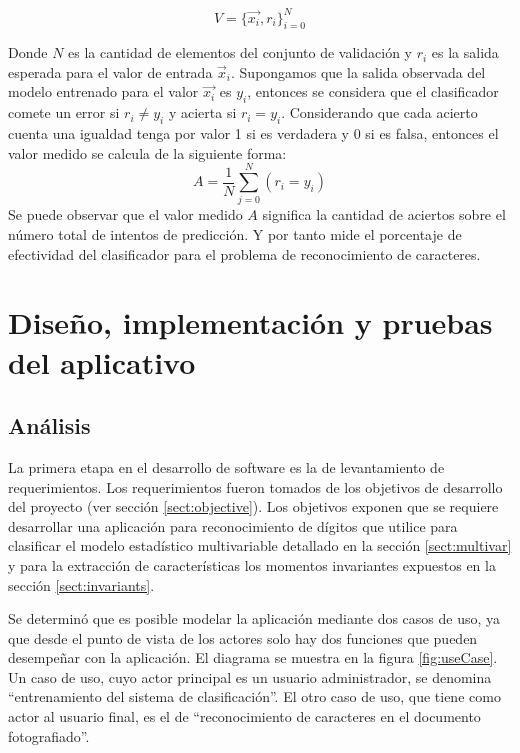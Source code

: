 \documentclass[a4paper, 11pt, oneside]{report}
\begin{document}
\[ V = \{\vec{x_i},r_i\}_{i=0}^N \]


Donde $N$ es la cantidad de elementos del conjunto de validación y $r_i$ es la salida esperada para el valor de entrada $\vec{x}_i$. Supongamos que la salida observada del modelo entrenado para el valor $\vec{x_i}$ es $y_i$, entonces se considera que el clasificador comete un error si $r_i \ne y_i$ y acierta si $r_i = y_i$. Considerando que cada acierto cuenta  una igualdad tenga por valor 1 si es verdadera y 0 si es falsa, entonces el valor medido se calcula de la siguiente forma:
\[ A = \frac{1}{N} \sum_{j=0}^{N}(r_i=y_i) \]
Se puede observar que el valor medido $A$ significa la cantidad de aciertos sobre el número total de intentos de predicción. Y por tanto mide el porcentaje de efectividad del clasificador para el problema de reconocimiento de caracteres.

\chapter{Diseño, implementación y pruebas del aplicativo}
\label{chap:ingSw}

\section{Análisis}

La primera etapa en el desarrollo de software es la de levantamiento de requerimientos. Los requerimientos fueron tomados de los objetivos de desarrollo del proyecto (ver sección \ref{sect:objective}). Los objetivos exponen que se requiere desarrollar una aplicación para reconocimiento de dígitos que utilice para clasificar el modelo estadístico multivariable detallado en la sección \ref{sect:multivar} y para la extracción de características los momentos invariantes expuestos en la sección \ref{sect:invariants}.

Se determinó que es posible modelar la aplicación mediante dos casos de uso, ya que desde el punto de vista de los actores solo hay dos funciones que pueden desempeñar con la aplicación. El diagrama se muestra en la figura \ref{fig:useCase}. Un caso de uso, cuyo actor principal es un usuario administrador, se denomina ``entrenamiento del sistema de clasificación''. El otro caso de uso, que tiene como actor al usuario final, es el de ``reconocimiento de caracteres en el documento fotografiado''.
\end{document}
